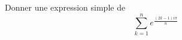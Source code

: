 Donner une expression simple de
\begin{displaymath}
\sum_{k=1}^n e^{ \frac{(2k-1)i\pi}{n}}
\end{displaymath}
\bigskip